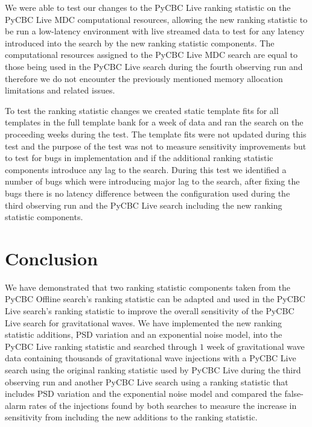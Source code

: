 We were able to test our changes to the PyCBC Live ranking statistic on the PyCBC Live MDC computational resources, allowing the new ranking statistic to be run a low-latency environment with live streamed data to test for any latency introduced into the search by the new ranking statistic components. The computational resources assigned to the PyCBC Live MDC search are equal to those being used in the PyCBC Live search during the fourth observing run and therefore we do not encounter the previously mentioned memory allocation limitations and related issues.

To test the ranking statistic changes we created static template fits for all templates in the full template bank for a week of data and ran the search on the proceeding weeks during the test. The template fits were not updated during this test and the purpose of the test was not to measure sensitivity improvements but to test for bugs in implementation and if the additional ranking statistic components introduce any lag to the search. During this test we identified a number of bugs which were introducing major lag to the search, after fixing the bugs there is no latency difference between the configuration used during the third observing run and the PyCBC Live search including the new ranking statistic components.
%
%





\section{\label{5:sec:conclusion}Conclusion}

We have demonstrated that two ranking statistic components taken from the PyCBC Offline search's ranking statistic can be adapted and used in the PyCBC Live search's ranking statistic to improve the overall sensitivity of the PyCBC Live search for gravitational waves. We have implemented the new ranking statistic additions, PSD variation and an exponential noise model, into the PyCBC Live ranking statistic and searched through $1$ week of gravitational wave data containing thousands of gravitational wave injections with a PyCBC Live search using the original ranking statistic used by PyCBC Live during the third observing run and another PyCBC Live search using a ranking statistic that includes PSD variation and the exponential noise model and compared the false-alarm rates of the injections found by both searches to measure the increase in sensitivity from including the new additions to the ranking statistic. 

